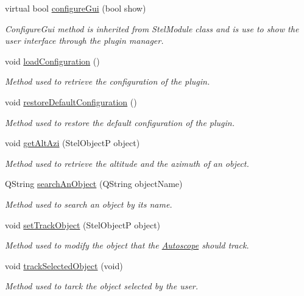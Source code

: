 \begin{DoxyCompactItemize}
virtual bool \hyperlink{class_autoscope_a1a3fca34a12ae80391943194340d2c7e}{configure\+Gui} (bool show)
\begin{DoxyCompactList}\small\item\em Configure\+Gui method is inherited from Stel\+Module class and is use to show the user interface through the plugin manager. \end{DoxyCompactList}\item 
void \hyperlink{class_autoscope_af24c123f39ace0191799b5c20ceca7a6}{load\+Configuration} ()
\begin{DoxyCompactList}\small\item\em Method used to retrieve the configuration of the plugin. \end{DoxyCompactList}\item 
void \hyperlink{class_autoscope_a2c5424afe3270c6069e0109834dd52b5}{restore\+Default\+Configuration} ()
\begin{DoxyCompactList}\small\item\em Method used to restore the default configuration of the plugin. \end{DoxyCompactList}\item 
void \hyperlink{class_autoscope_af61a84b86f02cc55472c53cc79b025b2}{get\+Alt\+Azi} (Stel\+ObjectP object)
\begin{DoxyCompactList}\small\item\em Method used to retrieve the altitude and the azimuth of an object. \end{DoxyCompactList}\item 
Q\+String \hyperlink{class_autoscope_af1d803331f5ab5f5ff5d3839df8952c7}{search\+An\+Object} (Q\+String object\+Name)
\begin{DoxyCompactList}\small\item\em Method used to search an object by it\textquotesingle{}s name. \end{DoxyCompactList}\item 
void \hyperlink{class_autoscope_a0a616d2998641471cb6785e2abb6e7b5}{set\+Track\+Object} (Stel\+ObjectP object)
\begin{DoxyCompactList}\small\item\em Method used to modify the object that the \hyperlink{class_autoscope}{Autoscope} should track. \end{DoxyCompactList}\item 
void \hyperlink{class_autoscope_a5782dc8cf3afeb9710240fdc98d0caa1}{track\+Selected\+Object} (void)
\begin{DoxyCompactList}\small\item\em Method used to tarck the object selected by the user. \end{DoxyCompactList}\item 

\end{DoxyCompactItemize}
